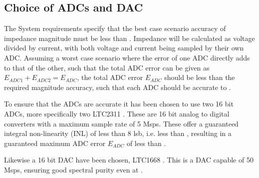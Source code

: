 \subsection{Choice of ADCs and DAC} \label{subsec:ADC_DAC_Choice}
The System requirements specify that the best case scenario accuracy of impedance magnitude must be less than . Impedance will be calculated as voltage divided by current, with both voltage and current being sampled by their own ADC. Assuming a worst case scenario where the error of one ADC directly adds to that of the other, such that the total ADC error can be given as $E_{ADC1}+E_{ADC2} = E_{ADC}$, the total ADC error $E_{ADC}$ should be less than the required magnitude accuracy, such that each ADC should be accurate to .

To ensure that the ADCs are accurate it has been chosen to use two 16 bit ADCs, more specifically two LTC2311 \cite{ADC_LTC2311}. These are 16 bit analog to digital converters with a maximum sample rate of 5 Msps. These offer a guaranteed integral non-linearity (INL) of less than 8 lsb, i.e. less than , resulting in a guaranteed maximum ADC error $E_{ADC}$ of less than .

Likewise a 16 bit DAC have been chosen, LTC1668 \cite{DAC_LTC1668}. This is a DAC capable of 50 Msps, ensuring good spectral purity even at .